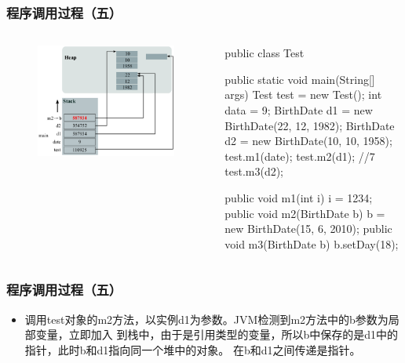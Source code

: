 \documentclass[hyperref={pdfpagelabels=false},compress,table]{beamer} %
\begin{document}
\begin{frame}[fragile] %
\frametitle{程序调用过程（五）}

\begin{columns}
\begin{figure}
\centering
\includegraphics[width=0.98\textwidth]{fig05.pdf}
\end{figure}

\begin{javaCode}\small
public class Test {
  public static void main(String[] args) {
    Test test = new Test(); 
    int data = 9; 
    BirthDate d1 = new BirthDate(22, 12, 1982); 
    BirthDate d2 = new BirthDate(10, 10, 1958); 
    test.m1(date); 
    test.m2(d1); //7
    test.m3(d2);
  }

  public void m1(int i) {
    i = 1234; 
  }
  public void m2(BirthDate b) { 
    b = new BirthDate(15, 6, 2010);
  }
  public void m3(BirthDate b) {
    b.setDay(18);
  }
}
\end{javaCode}
\end{columns}
\end{frame}

\begin{frame}[fragile] %
\frametitle{程序调用过程（五）}
\begin{itemize}
\item 调用test对象的m2方法，以实例d1为参数。JVM检测到m2方法中的b参数为局部变量，立即加入
  到栈中，由于是引用类型的变量，所以b中保存的是d1中的指针，此时b和d1指向同一个堆中的对象。
  在b和d1之间传递是指针。
\end{itemize}
\end{frame}
\end{document}
